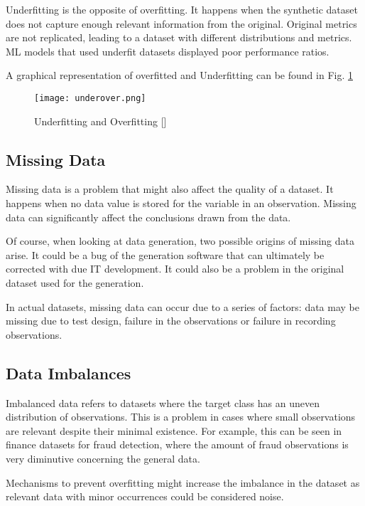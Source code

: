 Underfitting is the opposite of overfitting. It happens when the synthetic dataset does not capture enough relevant information from the original. Original metrics are not replicated, leading to a dataset with different distributions and metrics. ML models that used underfit datasets displayed poor performance ratios.

A graphical representation of overfitted and Underfitting can be found in Fig. \ref{fig:fitting}
\begin{figure}[!h]
  \begin{center}
    \leavevmode
    \texttt{[image: underover.png]}
    \caption[Underfitting and Overfitting]{Underfitting and Overfitting [\cite{holbrook}]}
    \label{fig:fitting}
  \end{center}
\end{figure}

\subsection{Missing Data}
Missing data is a problem that might also affect the quality of a dataset. It happens when no data value is stored for the variable in an observation. Missing data can significantly affect the conclusions drawn from the data.

Of course, when looking at data generation, two possible origins of missing data arise. It could be a bug of the generation software that can ultimately be corrected with due IT development. It could also be a problem in the original dataset used for the generation.

In actual datasets, missing data can occur due to a series of factors: data may be missing due to test design, failure in the observations or failure in recording observations.

\subsection{Data Imbalances}
Imbalanced data refers to datasets where the target class has an uneven distribution of observations. This is a problem in cases where small observations are relevant despite their minimal existence. For example, this can be seen in finance datasets for fraud detection, where the amount of fraud observations is very diminutive concerning the general data.

Mechanisms to prevent overfitting might increase the imbalance in the dataset as relevant data with minor occurrences could be considered noise.

